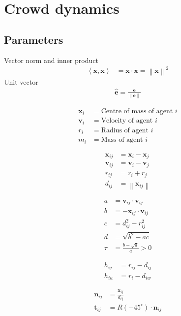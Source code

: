 \section{Crowd dynamics}
\subsection{Parameters}
Vector norm and inner product
\begin{align}
\left\langle \mathbf{x}, \mathbf{x} \right\rangle &= \mathbf{x} \cdot \mathbf{x} = \left\| \mathbf{x}\right\|^{2}
\end{align}
Unit vector
\begin{align}
\hat{\mathbf{e}} = \frac{\mathbf{e}}{\left\|\mathbf{e}\right\|}
\end{align}

\begin{align}
\mathbf{x}_{i} &= \text{Centre of mass of agent } i \\
\mathbf{v}_{i} &= \text{Velocity of agent } i \\
r_{i} &= \text{Radius of agent } i \\
m_{i} &= \text{Mass of agent } i
\end{align}

\begin{align}
\mathbf{x}_{ij} &= \mathbf{x}_{i} - \mathbf{x}_{j} \\
\mathbf{v}_{ij} &= \mathbf{v}_{i} - \mathbf{v}_{j} \\
r_{ij} &= r_{i} + r_{j} \\
d_{ij} &= \left\|\mathbf{x}_{ij}\right\|
\end{align}

\begin{align}
a &= \mathbf{v}_{ij} \cdot \mathbf{v}_{ij} \\
b &= -\mathbf{x}_{ij} \cdot \mathbf{v}_{ij} \\
c &= d_{ij}^{2} - r_{ij}^{2} \\
d &= \sqrt{b^{2} - a c} \\
\tau &= \frac{b - \sqrt{d}}{a} > 0
\end{align}

\begin{align}
h_{ij} &= r_{ij} - d_{ij} \\
h_{iw} &= r_{i} - d_{iw}
\end{align}

\begin{align}
\mathbf{n}_{ij} &= \frac{\mathbf{x}_{ij}}{d_{ij}} \\
\mathbf{t}_{ij} &= R(-45^{\circ}) \cdot \mathbf{n}_{ij} \\
\end{align}

